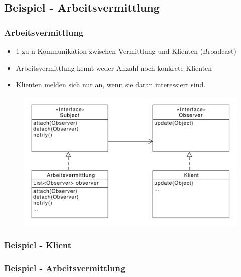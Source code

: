 \subsection{Beispiel - Arbeitsvermittlung}
\begin{frame}
	\frametitle{Arbeitsvermittlung}
	\begin{itemize}
		\item 1-zu-n-Kommunikation zwischen Vermittlung und Klienten (Broadcast)
		\item Arbeitsvermittlung kennt weder Anzahl noch konkrete Klienten
		\item Klienten melden sich nur an, wenn sie daran interessiert sind.
	\end{itemize}		 
  	\begin{figure}
		\includegraphics[scale=.4]{paper/observer/arbeitsvermittlung}
	\end{figure}
\end{frame}


\begin{frame}
\frametitle{Beispiel - Klient}
\end{frame}

\begin{frame}
\frametitle{Beispiel - Arbeitsvermittlung}
\end{frame}

